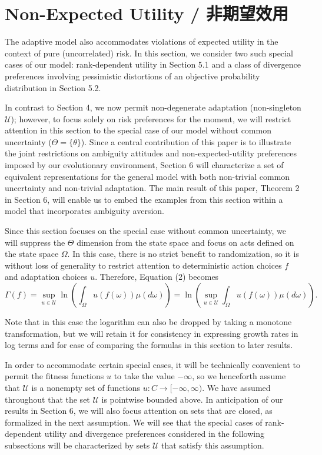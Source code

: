 \documentclass[12pt,a4paper]{article}
\newenvironment{original}
  {\par\noindent\color{black}\smallskip}
  {\par\smallskip}
\begin{document}
\section{Non-Expected Utility / 非期望效用}

\begin{original}
The adaptive model also accommodates violations of expected utility in the context of pure (uncorrelated) risk. In this section, we consider two such special cases of our model: rank-dependent utility in Section 5.1 and a class of divergence preferences involving pessimistic distortions of an objective probability distribution in Section 5.2.

In contrast to Section 4, we now permit non-degenerate adaptation (non-singleton $\mathcal{U}$); however, to focus solely on risk preferences for the moment, we will restrict attention in this section to the special case of our model without common uncertainty ($\Theta = \{\theta\}$). Since a central contribution of this paper is to illustrate the joint restrictions on ambiguity attitudes and non-expected-utility preferences imposed by our evolutionary environment, Section 6 will characterize a set of equivalent representations for the general model with both non-trivial common uncertainty and non-trivial adaptation. The main result of this paper, Theorem 2 in Section 6, will enable us to embed the examples from this section within a model that incorporates ambiguity aversion.

Since this section focuses on the special case without common uncertainty, we will suppress the $\Theta$ dimension from the state space and focus on acts defined on the state space $\Omega$. In this case, there is no strict benefit to randomization, so it is without loss of generality to restrict attention to deterministic action choices $f$ and adaptation choices $u$. Therefore, Equation (2) becomes
\[
\Gamma(f) = \sup_{u \in \mathcal{U}} \ln\left( \int_\Omega u(f(\omega)) \mu(d\omega) \right)
= \ln\left( \sup_{u \in \mathcal{U}} \int_\Omega u(f(\omega)) \mu(d\omega) \right).
\]

Note that in this case the logarithm can also be dropped by taking a monotone transformation, but we will retain it for consistency in expressing growth rates in log terms and for ease of comparing the formulas in this section to later results.

In order to accommodate certain special cases, it will be technically convenient to permit the fitness functions $u$ to take the value $-\infty$, so we henceforth assume that $\mathcal{U}$ is a nonempty set of functions $u: C \to [-\infty, \infty)$. We have assumed throughout that the set $\mathcal{U}$ is pointwise bounded above. In anticipation of our results in Section 6, we will also focus attention on sets that are closed, as formalized in the next assumption. We will see that the special cases of rank-dependent utility and divergence preferences considered in the following subsections will be characterized by sets $\mathcal{U}$ that satisfy this assumption.
\end{original}
\end{document}
